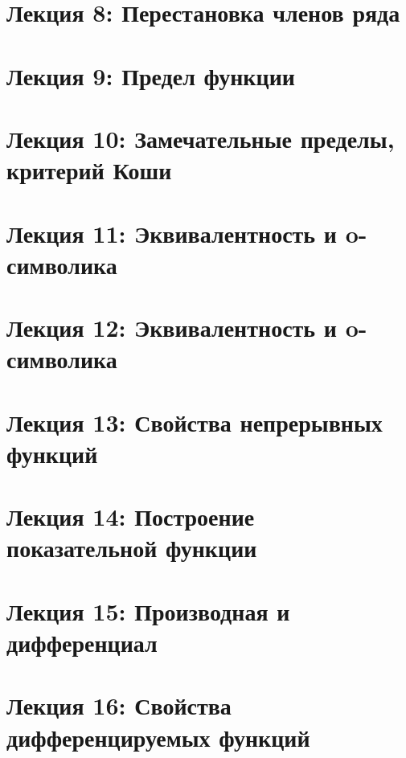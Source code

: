 	\newpage
	
	\section{Лекция 8: Перестановка членов ряда}
	
	\newpage
	
	\section{Лекция 9: Предел функции}
	
	\newpage
	
	\section{Лекция 10: Замечательные пределы, критерий Коши}
	
	\newpage
	
	\section{Лекция 11: Эквивалентность и o-символика}
	
	\newpage
	
	\section{Лекция 12: Эквивалентность и o-символика}
	
	\newpage
	
	\section{Лекция 13: Свойства непрерывных функций}
		
	\newpage
	
	\section{Лекция 14: Построение показательной функции}
	
	\newpage
	
	\section{Лекция 15: Производная и дифференциал}
	
	\newpage
	
	\section{Лекция 16: Свойства дифференцируемых функций}
	
